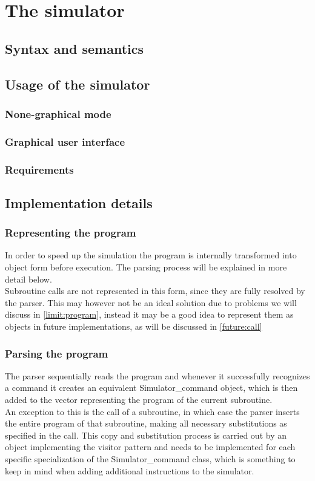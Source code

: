 \chapter{The simulator}
\label{chap:simulator}
\section{Syntax and semantics}
\section{Usage of the simulator}
\subsection{None-graphical mode}
\subsection{Graphical user interface}
\subsection{Requirements}
\section{Implementation details}
\subsection{Representing the program}
In order to speed up the simulation the program is internally transformed into object form before execution. The parsing process will be explained in more detail below.\\
Subroutine calls are not represented in this form, since they are fully resolved by the parser. This may however not be an ideal solution due to problems we will discuss in \autoref{limit:program}, instead it may be a good idea to represent them as objects in future implementations, as will be discussed in \autoref{future:call}

\subsection{Parsing the program}
The parser sequentially reads the program and whenever it successfully recognizes a command it creates an equivalent Simulator\_command object, which is then added to the vector representing the program of the current subroutine.\\
An exception to this is the call of a subroutine, in which case the parser inserts the entire program of that subroutine, making all necessary substitutions as specified in the call. This copy and substitution process is carried out by an object implementing the visitor pattern and needs to be implemented for each specific specialization of the Simulator\_command class, which is something to keep in mind when adding additional instructions to the simulator.

